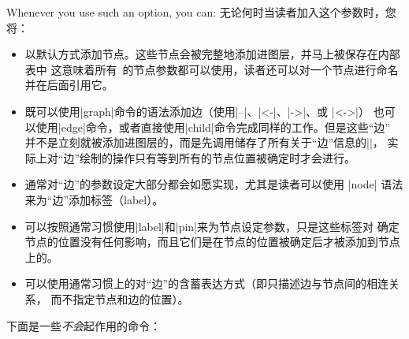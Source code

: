 Whenever you use such an option, you can:
无论何时当读者加入这个参数时，您将：
\begin{itemize}
\item 
以默认方式添加节点。这些节点会被完整地添加进图层，并马上被保存在内部表中
这意味着所有\tikzname\ 的节点参数都可以使用，读者还可以对一个节点进行命名
并在后面引用它。
\item
既可以使用|graph|命令的语法添加边（使用|--|、|<-|、|->|、或 |<->|）
也可以使用|edge|命令，或者直接使用|child|命令完成同样的工作。但是这些“边”
并不是立刻就被添加进图层的，而是先调用储存了所有关于“边”信息的|\pgfgdege|，
实际上对“边”绘制的操作只有等到所有的节点位置被确定时才会进行。
\item
通常对“边”的参数设定大部分都会如愿实现，尤其是读者可以使用
|node| 语法来为“边”添加标签（label）。
\item
可以按照通常习惯使用|label|和|pin|来为节点设定参数，只是这些标签对
确定节点的位置没有任何影响，而且它们是在节点的位置被确定后才被添加到节点上的。
\item
可以使用通常习惯上的对“边”的含蓄表达方式（即只描述边与节点间的相连关系，
而不指定节点和边的位置）。
\end{itemize}
下面是一些\emph{不会}起作用的命令：
